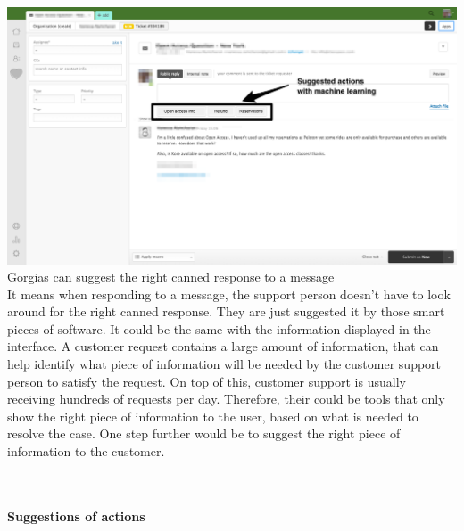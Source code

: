 \documentclass[12pt]{article}
\begin{document}
\\
\includegraphics[width=\textwidth]{zendesk}
Gorgias can suggest the right canned response to a message
\\

It means when responding to a message, the support person doesn't have to look around for the right canned response. They are just suggested it by those smart pieces of software.
It could be the same with the information displayed in the interface. A customer request contains a large amount of information, that can help identify what piece of information will be needed by the customer support person to satisfy the request. On top of this, customer support is usually receiving hundreds of requests per day. Therefore, their could be tools that only show the right piece of information to the user, based on what is needed to resolve the case. One step further would be to suggest the right piece of information to the customer.

\\
\paragraph{Suggestions of actions}
\\
\end{document}
